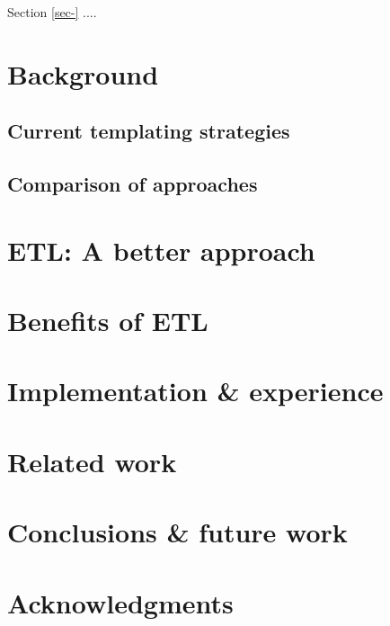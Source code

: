 \documentclass{www2003-submission}
\begin{document}
Section \ref{sec-} ....

\section{Background}


\subsection{Current templating strategies}

\subsection{Comparison of approaches}



\section{ETL: A better approach}


\section{Benefits of ETL}

\section{Implementation \& experience}

\section{Related work}



\section{Conclusions \& future work}


\section{Acknowledgments}



%
\appendix
\end{document}
